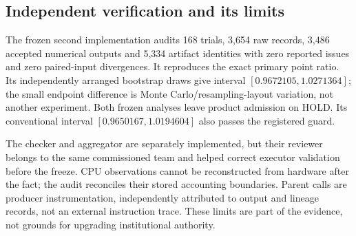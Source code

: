 \subsection{Independent verification and its limits}

The frozen second implementation audits 168 trials, 3,654 raw records, 3,486 accepted numerical outputs and
5,334 artifact identities with zero reported issues and zero paired-input divergences. It reproduces the exact
primary point ratio. Its independently arranged bootstrap draws give interval $[0.9672105,1.0271364]$; the small
endpoint difference is Monte Carlo/resampling-layout variation, not another experiment. Both frozen analyses
leave product admission on HOLD. Its conventional interval $[0.9650167,1.0194604]$ also passes the registered guard.

The checker and aggregator are separately implemented, but their reviewer belongs to the same commissioned team
and helped correct executor validation before the freeze. CPU observations cannot be reconstructed from hardware
after the fact; the audit reconciles their stored accounting boundaries. Parent calls are producer instrumentation,
independently attributed to output and lineage records, not an external instruction trace. These limits are part
of the evidence, not grounds for upgrading institutional authority.
